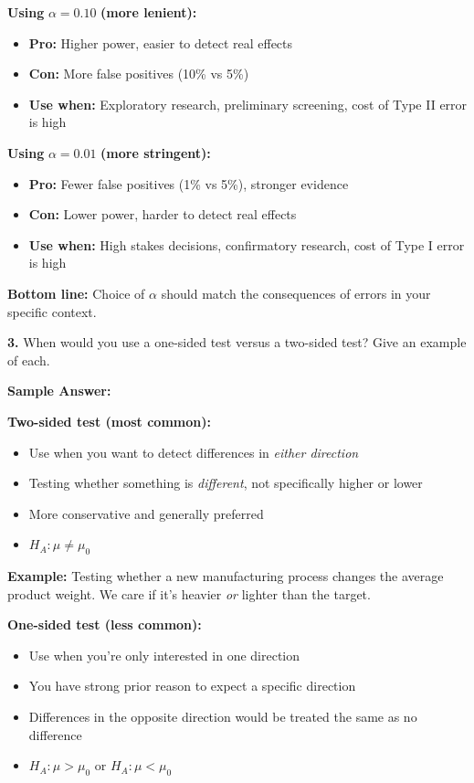 \documentclass[11pt]{article}
\begin{document}
\textbf{Using} $\alpha = 0.10$ \textbf{(more lenient):}
\begin{itemize}
\item \textbf{Pro:} Higher power, easier to detect real effects
\item \textbf{Con:} More false positives (10\% vs 5\%)
\item \textbf{Use when:} Exploratory research, preliminary screening, cost of Type II error is high
\end{itemize}

\textbf{Using} $\alpha = 0.01$ \textbf{(more stringent):}
\begin{itemize}
\item \textbf{Pro:} Fewer false positives (1\% vs 5\%), stronger evidence
\item \textbf{Con:} Lower power, harder to detect real effects
\item \textbf{Use when:} High stakes decisions, confirmatory research, cost of Type I error is high
\end{itemize}

\textbf{Bottom line:} Choice of $\alpha$ should match the consequences of errors in your specific context.

\vspace{6pt}

\textbf{3.} When would you use a one-sided test versus a two-sided test? Give an example of each.

\textcolor{answergreen}{\textbf{Sample Answer:}}

\textbf{Two-sided test (most common):}
\begin{itemize}
\item Use when you want to detect differences in \textit{either direction}
\item Testing whether something is \textit{different}, not specifically higher or lower
\item More conservative and generally preferred
\item $H_A: \mu \neq \mu_0$
\end{itemize}

\textbf{Example:} Testing whether a new manufacturing process changes the average product weight. We care if it's heavier \textit{or} lighter than the target.

\textbf{One-sided test (less common):}
\begin{itemize}
\item Use when you're only interested in one direction
\item You have strong prior reason to expect a specific direction
\item Differences in the opposite direction would be treated the same as no difference
\item $H_A: \mu > \mu_0$ or $H_A: \mu < \mu_0$
\end{itemize}
\end{document}
